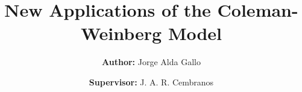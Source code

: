 \documentclass[aps,prd,preprintnumbers,nofootinbibn,twocolumn]{revtex4}
\begin{document}
\title{\Large New Applications of the Coleman-Weinberg Model}
\author{\textbf{Author:} Jorge Alda Gallo}


\author{\textbf{Supervisor:} J. A. R. Cembranos}

\end{document}
